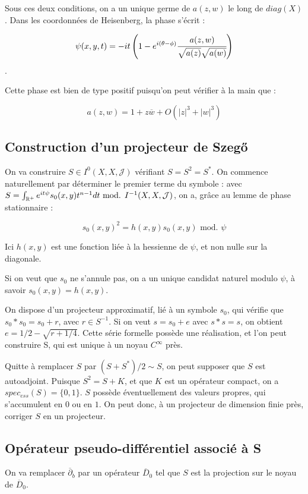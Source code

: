 Sous ces deux conditions, on a un unique germe de $a(z,w)$ le long de $diag(X)$. Dans les coordonnées de Heisenberg, la phase s'écrit :

\begin{equation*}
	\psi(x,y,t) = -it\left(1-e^{i(\theta-\phi)}\cfrac{a(z,w)}{\sqrt{a(z)}\sqrt{a(w)}}\right)
\end{equation*}.

Cette phase est bien de type positif puisqu'on peut vérifier à la main que :

\begin{equation*}
	a(z,w) = 1 + z\overline{w} + O(|z|^3 + |w|^3)
\end{equation*}

\subsection{Construction d'un projecteur de Szeg\H{o}}

On va construire $S \in I^0(X,X,\mathcal{J})$ vérifiant $S =S^2 = S^*$. On commence naturellement par déterminer le premier terme du symbole : avec $S = \int_{\mathbb{R}^+}e^{it\psi}s_0(x,y)t^{n-1}dt \text{ mod. } I^{-1}(X,X,\mathcal{J})$, on a, grâce au lemme de phase stationnaire :

\begin{equation*}
	s_0(x,y)^2= h(x,y)s_0(x,y) \text{ mod. } \psi
\end{equation*}

Ici $h(x,y)$ est une fonction liée à la hessienne de $\psi$, et non nulle sur la diagonale.

Si on veut que $s_0$ ne s'annule pas, on a un unique candidat naturel modulo $\psi$, à savoir $s_0(x,y)= h(x,y)$.

On dispose d'un projecteur approximatif, lié à un symbole $s_0$, qui vérifie que $s_0 * s_0 = s_0 +r$, avec $r \in S^{-1}$. Si on veut $s=s_0 + e$ avec $s * s = s$, on obtient $e = 1/2 - \sqrt{r + 1/4}$. Cette série formelle possède une réalisation, et l'on peut construire S, qui est unique à un noyau $C^{\infty}$ près.

Quitte à remplacer $S$ par $(S+S^*)/2 \sim S$, on peut supposer que $S$ est autoadjoint. Puisque $S^2=S+K$, et que $K$ est un opérateur compact, on a $spec_{ess}(S)=\{0,1\}$. $S$ possède éventuellement des valeurs propres, qui s'accumulent en $0$ ou en $1$. On peut donc, à un projecteur de dimension finie près, corriger $S$ en un projecteur.

\subsection{Opérateur  pseudo-différentiel associé à S}
On va remplacer $\overline{\partial}_b$ par un opérateur $\overline{D}_0$ tel que $S$ est la projection sur le noyau de $\overline{D}_0$. 

